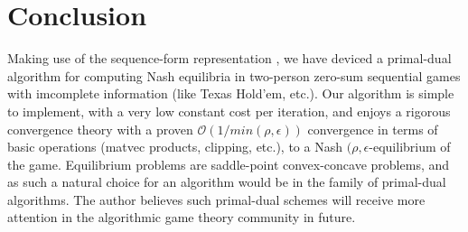 \documentclass{article} %
\begin{document}
\section{Conclusion}
Making use of the sequence-form representation
\cite{koller1992complexity,von1996efficient,vonequilibrium}, we have
deviced a primal-dual algorithm for computing Nash equilibria in
two-person zero-sum sequential games with imcomplete information (like
Texas Hold'em, etc.). Our algorithm is simple to implement, with a
very low constant cost per iteration, and enjoys a rigorous
convergence theory with a proven $\mathcal{O}(1/min(\rho,\epsilon))$ convergence
in terms of basic operations (matvec products, clipping, etc.), to a
Nash $(\rho,\epsilon$-equilibrium of the game.
Equilibrium problems are saddle-point convex-concave problems, and as
such a natural choice for an algorithm would be in the family of
primal-dual algorithms. The author believes such primal-dual schemes
will receive more attention in the algorithmic game theory community
in future.


\medskip \noindent

\small


\end{document}
